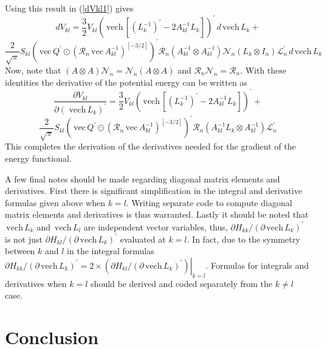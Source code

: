 \documentclass[12pt,thmsa,suthesis,verbatim]{report}
\begin{document}
Using this result in (\ref{dVkl1}) gives 
\begin{equation}
dV_{kl}=\frac 32V_{kl}\left( \,\mathrm{vech}\,\left[ \left( L_k^{-1}\right)
^{\prime }-2A_{kl}^{-1}L_k\right] \right) ^{\prime }\,d\,\mathrm{vech}\,L_k+
\end{equation}
\[
\frac 2{\sqrt{\pi }}S_{kl}\left( \,\mathrm{vec}\,Q^{\prime }\odot \left( 
\mathcal{R}_n\,\mathrm{vec}\,A_{kl}^{-1}\right) ^{\left[ -3/2\right]
}\right) ^{\prime }\mathcal{R}_n\left( A_{kl}^{-1}\otimes A_{kl}^{-1}\right) 
\mathcal{N}_n\left( L_k\otimes I_n\right) \mathcal{L}_n^{\prime }\,d\,%
\mathrm{vech}\,L_k 
\]
Now, note that $\left( A\otimes A\right) \mathcal{N}_n=\mathcal{N}_n\left(
A\otimes A\right) $ and $\mathcal{R}_n\mathcal{N}_n=\mathcal{R}_n$. With
these identities the derivative of the potential energy can be written as 
\[
\frac{\partial V_{kl}}{\partial \left( \,\,\mathrm{vech}\,L_k\right)
^{\prime }}=\frac 32V_{kl}\left( \,\mathrm{vech}\,\left[ \left(
L_k^{-1}\right) ^{\prime }-2A_{kl}^{-1}L_k\right] \right) ^{\prime }+ 
\]
\begin{equation}
\frac 2{\sqrt{\pi }}S_{kl}\left( \,\mathrm{vec}\,Q^{\prime }\odot \left( 
\mathcal{R}_n\,\mathrm{vec}\,A_{kl}^{-1}\right) ^{\left[ -3/2\right]
}\right) ^{\prime }\mathcal{R}_n\left( A_{kl}^{-1}L_k\otimes
A_{kl}^{-1}\right) \mathcal{L}_n^{\prime }
\end{equation}
This completes the derivation of the derivatives needed for the gradient of
the energy functional.

A few final notes should be made regarding diagonal matrix elements and
derivatives. First there is significant simplification in the integral and
derivative formulas given above when $k=l$. Writing separate code to compute
diagonal matrix elements and derivatives is thus warranted. Lastly it should
be noted that $\,\mathrm{vech}\,L_k$ and $\,\mathrm{vech}\,L_l$ are
independent vector variables, thus, $\partial H_{kk}/\left( \partial \,%
\mathrm{vech}\,L_k\right) ^{\prime }$ is not just $\partial H_{kl}/\left(
\partial \,\mathrm{vech}\,L_k\right) ^{\prime }$ evaluated at $k=l$. In
fact, due to the symmetry between $k$ and $l$ in the integral formulas $%
\partial H_{kk}/\left( \partial \,\mathrm{vech}\,L_k\right) ^{\prime
}=2\times \left. \left( \partial H_{kl}/\left( \partial \,\mathrm{vech}%
\,L_k\right) ^{\prime }\right) \right| _{k=l}$. Formulas for integrals and
derivatives when $k=l$ should be derived and coded separately from the $%
k\neq l$ case.

\section{Conclusion}
\end{document}
